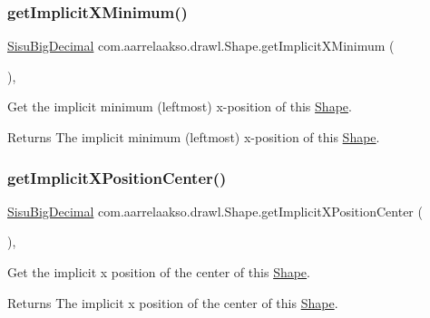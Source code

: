 \subsubsection{\texorpdfstring{get\+Implicit\+X\+Minimum()}{getImplicitXMinimum()}}
{\footnotesize\ttfamily \hyperlink{classcom_1_1aarrelaakso_1_1drawl_1_1_sisu_big_decimal}{Sisu\+Big\+Decimal} com.\+aarrelaakso.\+drawl.\+Shape.\+get\+Implicit\+X\+Minimum (\begin{DoxyParamCaption}{ }\end{DoxyParamCaption})\hspace{0.3cm}{\ttfamily [protected]}, {\ttfamily [inherited]}}



Get the implicit minimum (leftmost) x-\/position of this \hyperlink{classcom_1_1aarrelaakso_1_1drawl_1_1_shape}{Shape}. 

\begin{DoxyReturn}{Returns}
The implicit minimum (leftmost) x-\/position of this \hyperlink{classcom_1_1aarrelaakso_1_1drawl_1_1_shape}{Shape}. 
\end{DoxyReturn}
\mbox{\label{classcom_1_1aarrelaakso_1_1drawl_1_1_shape_a50c12c30790bd28ec0b71b58f59b1e96}} 
\subsubsection{\texorpdfstring{get\+Implicit\+X\+Position\+Center()}{getImplicitXPositionCenter()}}
{\footnotesize\ttfamily \hyperlink{classcom_1_1aarrelaakso_1_1drawl_1_1_sisu_big_decimal}{Sisu\+Big\+Decimal} com.\+aarrelaakso.\+drawl.\+Shape.\+get\+Implicit\+X\+Position\+Center (\begin{DoxyParamCaption}{ }\end{DoxyParamCaption})\hspace{0.3cm}{\ttfamily [protected]}, {\ttfamily [inherited]}}



Get the implicit x position of the center of this \hyperlink{classcom_1_1aarrelaakso_1_1drawl_1_1_shape}{Shape}. 

\begin{DoxyReturn}{Returns}
The implicit x position of the center of this \hyperlink{classcom_1_1aarrelaakso_1_1drawl_1_1_shape}{Shape}. 
\end{DoxyReturn}
\mbox{\label{classcom_1_1aarrelaakso_1_1drawl_1_1_shape_ad9b2aee9937d5f034f7f4a2a1d979260}} 
